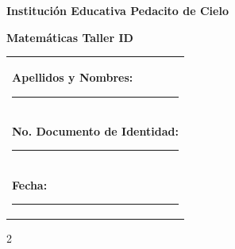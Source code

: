 \documentclass[10pt]{article}
\makeatletter
\newcommand{\myID}{\@ID}
\newcommand{\myDate}{\@Date}
\makeatother
\begin{document}
\thispagestyle{empty}
{\sf
\textbf{\LARGE{Institución Educativa Pedacito de Cielo}}

\textbf{\large{Matemáticas \myDate \hfill Taller ID \myID}}

\vspace*{1.5cm}

\begin{tabular}{p{14cm}}
\textbf{Apellidos y Nombres:} \hrule \\[1.2cm]
\textbf{No. Documento de Identidad:} \hrule \\[1.2cm]
\textbf{Fecha:} \hrule  \\[1.2cm]
\end{tabular}

\vspace*{0.5cm}

}
\newpage

\begin{multicols}{2}

\begin{enumerate}


\end{enumerate}

\end{multicols}
\end{document}
